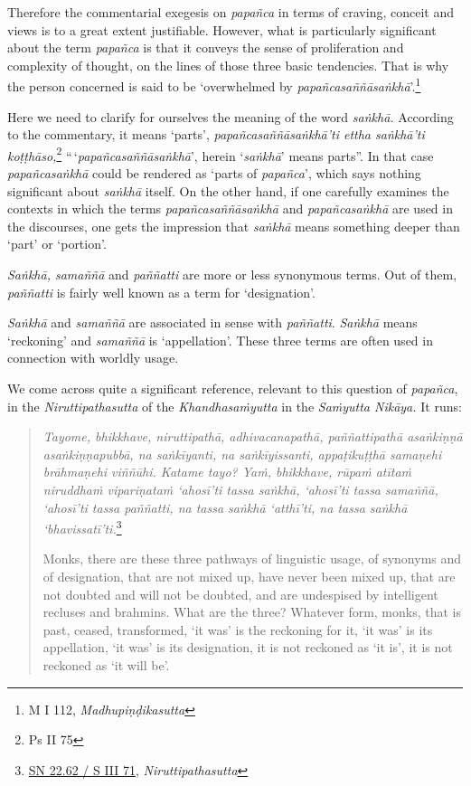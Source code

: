 Therefore the commentarial exegesis on \emph{papañca} in terms of craving, conceit and views is to a great extent justifiable. However, what is particularly significant about the term \emph{papañca} is that it conveys the sense of proliferation and complexity of thought, on the lines of those three basic tendencies. That is why the person concerned is said to be `overwhelmed by \emph{papañcasaññāsaṅkhā}'.\footnote{M I 112, \emph{Madhupiṇḍikasutta}}

Here we need to clarify for ourselves the meaning of the word \emph{saṅkhā.} According to the commentary, it means `parts', \emph{papañcasaññāsaṅkhā'ti ettha saṅkhā'ti koṭṭhāso,}\footnote{Ps II 75} ``\,`\emph{papañcasaññāsaṅkhā}', herein `\emph{saṅkhā}' means parts''. In that case \emph{papañcasaṅkhā} could be rendered as `parts of \emph{papañca}', which says nothing significant about \emph{saṅkhā} itself. On the other hand, if one carefully examines the contexts in which the terms \emph{papañcasaññāsaṅkhā} and \emph{papañcasaṅkhā} are used in the discourses, one gets the impression that \emph{saṅkhā} means something deeper than `part' or `portion'.

\emph{Saṅkhā, samaññā} and \emph{paññatti} are more or less synonymous terms. Out of them, \emph{paññatti} is fairly well known as a term for `designation'.

\emph{Saṅkhā} and \emph{samaññā} are associated in sense with \emph{paññatti}. \emph{Saṅkhā} means `reckoning' and \emph{samaññā} is `appellation'. These three terms are often used in connection with worldly usage.

We come across quite a significant reference, relevant to this question of \emph{papañca}, in the \emph{Niruttipathasutta} of the \emph{Khandhasaṁyutta} in the \emph{Saṁyutta Nikāya.} It runs:

\begin{quote}
\emph{Tayome, bhikkhave, niruttipathā, adhivacanapathā, paññattipathā asaṅkiṇṇā asaṅkiṇṇapubbā, na saṅkīyanti, na saṅkīyissanti, appaṭikuṭṭhā samaṇehi brāhmaṇehi viññūhi. Katame tayo? Yaṁ, bhikkhave, rūpaṁ atītaṁ niruddhaṁ vipariṇataṁ `ahosī'ti tassa saṅkhā, `ahosī'ti tassa samaññā, `ahosī'ti tassa paññatti, na tassa saṅkhā `atthī'ti, na tassa saṅkhā `bhavissatī'ti.}\footnote{\href{https://suttacentral.net/sn22.62/pli/ms}{SN 22.62 / S III 71}, \emph{Niruttipathasutta}}

Monks, there are these three pathways of linguistic usage, of synonyms and of designation, that are not mixed up, have never been mixed up, that are not doubted and will not be doubted, and are undespised by intelligent recluses and brahmins. What are the three? Whatever form, monks, that is past, ceased, transformed, `it was' is the reckoning for it, `it was' is its appellation, `it was' is its designation, it is not reckoned as `it is', it is not reckoned as `it will be'.
\end{quote}

